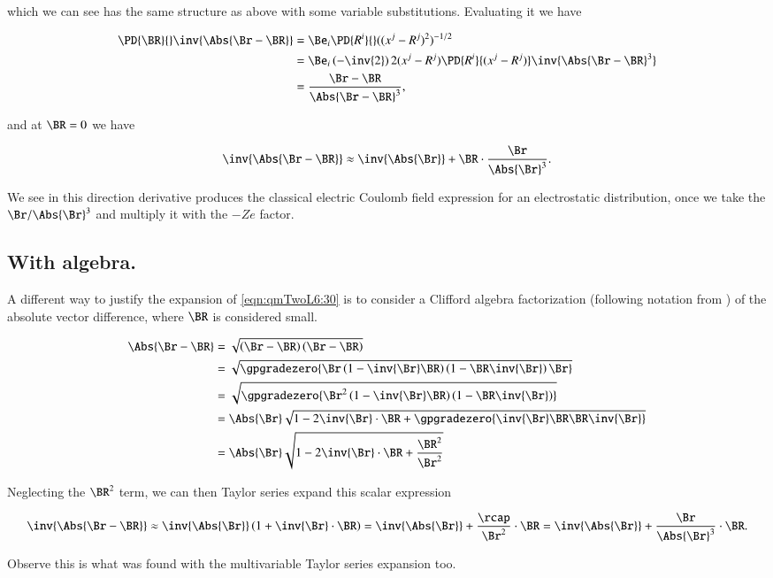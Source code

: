 which we can see has the same structure as above with some variable substitutions.  Evaluating it we have

\begin{align*}
\PD{\BR}{} \inv{\Abs{ \Br - \BR}}
&=
\Be_i \PD{R^i}{} ((x^j - R^j)^2)^{-1/2} \\
&=
\Be_i \left(-\inv{2}\right) 2 (x^j - R^j) \PD{R^i}{(x^j - R^j)} \inv{\Abs{\Br - \BR}^3} \\
&= \frac{\Br - \BR}{
\Abs{\Br - \BR}^3} ,
\end{align*}

and at $\BR = 0$ we have

\begin{equation}\label{eqn:qmTwoL6:190}
\inv{\Abs{\Br - \BR}} \approx \inv{\Abs{\Br}} 
+ 
\BR \cdot 
\frac{\Br}{\Abs{\Br}^3}.
\end{equation}

We see in this direction derivative produces the classical electric Coulomb field expression for an electrostatic distribution, once we take the $\Br/\Abs{\Br}^3$ and multiply it with the $- Z e$ factor.

\subsection{With algebra.}

A different way to justify the expansion of \ref{eqn:qmTwoL6:30} is to consider a Clifford algebra factorization (following notation from \cite{doran2003gap}) of the absolute vector difference, where $\BR$ is considered small.

\begin{align*}
\Abs{\Br - \BR}
&= \sqrt{ \left(\Br - \BR\right) \left(\Br - \BR\right) } \\
&= \sqrt{ \gpgradezero{\Br \left(1 - \inv{\Br} \BR\right) \left(1 - \BR \inv{\Br}\right) \Br} } \\
&= \sqrt{ \gpgradezero{\Br^2 \left(1 - \inv{\Br} \BR\right) \left(1 - \BR \inv{\Br}\right) } } \\
&= \Abs{\Br} \sqrt{ 1 - 2 \inv{\Br} \cdot \BR + \gpgradezero{\inv{\Br} \BR \BR \inv{\Br}}} \\
&= \Abs{\Br} \sqrt{ 1 - 2 \inv{\Br} \cdot \BR + \frac{\BR^2}{\Br^2}}
\end{align*}

Neglecting the $\BR^2$ term, we can then Taylor series expand this scalar expression 

\begin{equation}\label{eqn:qmTwoL6:150}
\inv{\Abs{\Br - \BR}} 
\approx
\inv{\Abs{\Br}} \left( 
1 + \inv{\Br} \cdot \BR
\right) 
=
\inv{\Abs{\Br}} 
+ \frac{\rcap}{\Br^2} \cdot \BR
=
\inv{\Abs{\Br}} 
+ \frac{\Br}{\Abs{\Br}^3} \cdot \BR.
\end{equation}

Observe this is what was found with the multivariable Taylor series expansion too. 

\EndArticle
